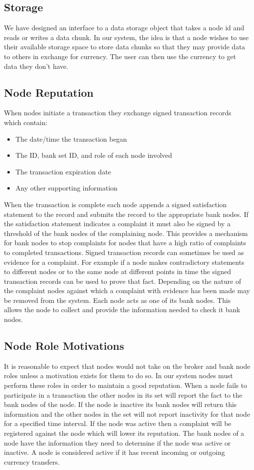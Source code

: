 \documentclass[%
				10pt,
        final,
        notitlepage,
        narroweqnarray,
        inline,
        twoside,
        ]{ieee}
\begin{document}
\subsection{Storage}
We have designed an interface to a data storage object that takes a node id and reads or writes a data chunk.  In our system, the idea is that a node wishes to use their available storage space to store data chunks so that they may provide data to others in exchange for currency.  The user can then use the currency to get data they don't have. 

\subsection{Node Reputation}
When nodes initiate a transaction they exchange signed transaction records which contain:
\begin{itemize}
\item The date/time the transaction began
\item The ID, bank set ID, and role of each node involved
\item The transaction expiration date
\item Any other supporting information
\end{itemize}
When the transaction is complete each node appends a signed satisfaction statement to the record and submits the record to the appropriate bank nodes. If the satisfaction statement indicates a complaint it must also be signed by a threshold of the bank nodes of the complaining node.  This provides a mechanism for bank nodes to stop complaints for nodes that have a high ratio of complaints to completed transactions.  Signed transaction records can sometimes be used as evidence for a complaint.  For example if a node makes contradictory statements to different nodes or to the same node at different points in time the signed transaction records can be used to prove that fact.  Depending on the nature of the complaint nodes against which a complaint with evidence has been made may be removed from the system.  Each node acts as one of its bank nodes.  This allows the node to collect and provide the information needed to check it bank nodes.

\subsection{Node Role Motivations}
It is reasonable to expect that nodes would not take on the broker and bank node roles unless a motivation exists for them to do so.  In our system nodes must perform these roles in order to maintain a good reputation.  When a node fails to participate in a transaction the other nodes in its set will report the fact to the bank nodes of the node.  If the node is inactive its bank nodes will return this information and the other nodes in the set will not report inactivity for that node for a specified time interval.  If the node was active then a complaint will be registered against the node which will lower its reputation.  The bank nodes of a node have the information they need to determine if the node was active or inactive.  A node is considered active if it has recent incoming or outgoing currency transfers.
\end{document}
